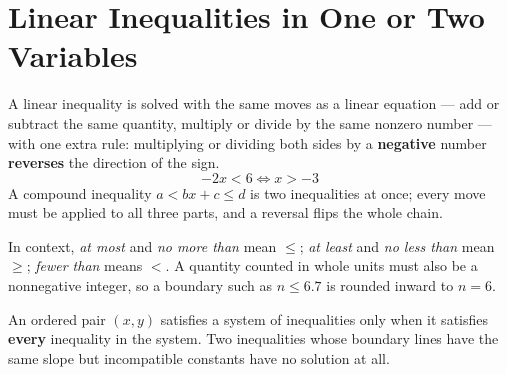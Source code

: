 \chapter{Linear Inequalities in One or Two Variables}

\begin{essentials}
A linear inequality is solved with the same moves as a linear equation --- add
or subtract the same quantity, multiply or divide by the same nonzero number
--- with one extra rule: multiplying or dividing both sides by a \textbf{negative}
number \textbf{reverses} the direction of the sign.
\[ -2x < 6 \iff x > -3 \]
A compound inequality $a < bx + c \le d$ is two inequalities at once; every
move must be applied to all three parts, and a reversal flips the whole chain.

In context, \emph{at most} and \emph{no more than} mean $\le$; \emph{at least}
and \emph{no less than} mean $\ge$; \emph{fewer than} means $<$. A quantity
counted in whole units must also be a nonnegative integer, so a boundary such
as $n \le 6.7$ is rounded inward to $n = 6$.

An ordered pair $(x,y)$ satisfies a system of inequalities only when it
satisfies \textbf{every} inequality in the system. Two inequalities whose
boundary lines have the same slope but incompatible constants have no
solution at all.
\end{essentials}

